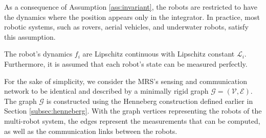 As a consequence of Assumption \ref{ass:invariant}, the robots are restricted to have the dynamics where the position appears only in the integrator. In practice, most robotic systems, such as rovers, aerial vehicles, and underwater robots, satisfy this assumption.
\begin{assumption}
\label{ass:dynamics}
The robot's dynamics $f_i$ are Lipschitz continuous with Lipschitz constant $\mathcal{L}_i$. Furthermore, it is assumed that each robot's state can be measured perfectly.
\end{assumption}

For the sake of simplicity, we consider the MRS's sensing and communication network to be identical and described by a minimally rigid graph $\mathcal{G} = (\mathcal{V},\mathcal{E})$. The graph $\mathcal{G}$ is constructed using the Henneberg construction defined earlier in Section \ref{subsec:henneberg}. With the graph vertices representing the robots of the multi-robot system, the edges represent the measurements that can be computed, as well as the communication links between the robots. %
